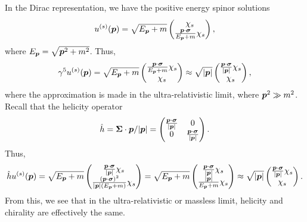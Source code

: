 {In the Dirac representation, we have the positive energy spinor solutions
\begin{align}
    u^{(s)}(\vb*{p}) = 
    \sqrt{E_{\vb*{p}} + m}
    \begin{pmatrix}
        \chi_{s} \\ \frac{\vb*{p} \cdot \vb*{\sigma}}{E_{\vb*{p}} + m} \chi_{s}
    \end{pmatrix} 
,\end{align}
where $E_{\vb*{p}} = \sqrt{\vb*{p}^2 + m^2}$.
Thus,
\begin{align}
    \gamma^{5} u^{(s)}(\vb*{p}) = 
    \sqrt{E_{\vb*{p}} + m}
    \begin{pmatrix}
        \frac{\vb*{p} \cdot \vb*{\sigma}}{E_{\vb*{p}} + m} \chi_{s} \\ \chi_{s}
    \end{pmatrix} 
    \approx
    \sqrt{|\vb*{p}|}
    \begin{pmatrix}
        \frac{\vb*{p} \cdot \vb*{\sigma}}{|\vb*{p}|} \chi_{s} \\ \chi_{s}
    \end{pmatrix} 
,\end{align}
where the approximation is made in the ultra-relativistic limit, where $\vb*{p}^2 \gg m^2$.
Recall that the helicity operator
\begin{align}    
    \hat{h} = \vb*{\Sigma} \cdot \vb*{p} / |\vb*{p}| = 
    \begin{pmatrix}
        \frac{\vb*{p} \cdot \vb*{\sigma}}{|\vb*{p}|} & 0 \\
        0 & \frac{\vb*{p} \cdot \vb*{\sigma}}{|\vb*{p}|}
    \end{pmatrix} 
.\end{align}
Thus,
\begin{align}
    \hat{h} u^{(s)}(\vb*{p}) = \sqrt{E_{\vb*{p}} + m} 
    \begin{pmatrix}
        \frac{\vb*{p} \cdot \vb*{\sigma}}{|\vb*{p}|} \chi_{s} \\
        \frac{(\vb*{p} \cdot \vb*{\sigma})^2}{|\vb*{p}|(E_{\vb*{p}} + m)} \chi_{s}
    \end{pmatrix} 
    =
    \sqrt{E_{\vb*{p}} + m} 
    \begin{pmatrix}
        \frac{\vb*{p} \cdot \vb*{\sigma}}{|\vb*{p}|} \chi_{s} \\
        \frac{|\vb*{p}|}{E_{\vb*{p}} + m} \chi_{s}
    \end{pmatrix}
    \approx
    \sqrt{|\vb*{p}|}
    \begin{pmatrix}
        \frac{\vb*{p} \cdot \vb*{\sigma}}{|\vb*{p}|} \chi_{s} \\
        \chi_{s}
    \end{pmatrix} 
.\end{align}
From this, we see that in the ultra-relativistic or massless limit, helicity and chirality are effectively the same.

}


